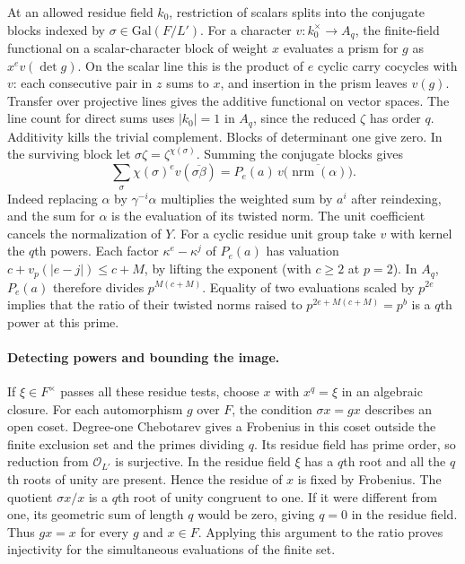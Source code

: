At an allowed residue field $k_0$, restriction of scalars splits into
the conjugate blocks indexed by $\sigma\in\mathrm{Gal}(F/L')$.
For a character $v:k_0^\times\to A_q$, the finite-field functional
on a scalar-character block of weight $x$ evaluates a prism for $g$
as $x^e v(\det g)$. On the scalar line this is the product of $e$
cyclic carry cocycles with $v$: each consecutive pair in $z$ sums to
$x$, and insertion in the prism leaves $v(g)$. Transfer over projective
lines gives the additive functional on vector spaces. The line count
for direct sums uses $|k_0|=1$ in $A_q$, since the reduced $\zeta$ has
order $q$. Additivity kills the trivial complement. Blocks of determinant
one give zero. In the surviving block let $\sigma\zeta=\zeta^{\chi(\sigma)}$.
Summing the conjugate blocks gives
\[
 \sum_\sigma \chi(\sigma)^e v(\overline{\sigma\beta})
   =P_e(a)\,v\big(\overline{\operatorname{nrm}(\alpha)}\big).
\]
Indeed replacing $\alpha$ by $\gamma^{-i}\alpha$ multiplies the
weighted sum by $a^i$ after reindexing, and the sum for $\alpha$ is
the evaluation of its twisted norm. The unit coefficient cancels the
normalization of $Y$. For a cyclic residue unit group take $v$ with
kernel the $q$th powers. Each factor $\kappa^e-\kappa^j$ of $P_e(a)$
has valuation $c+v_p(|e-j|)\le c+M$, by lifting the exponent
(with $c\ge2$ at $p=2$). In $A_q$, $P_e(a)$ therefore divides
$p^{M(c+M)}$. Equality of two evaluations scaled by $p^{2e}$
implies that the ratio of their twisted norms raised to
$p^{2e+M(c+M)}=p^b$ is a $q$th power at this prime.

\paragraph{Detecting powers and bounding the image.}\label{kone:rank}
If $\xi\in F^\times$ passes all these residue tests, choose
$x$ with $x^q=\xi$ in an algebraic closure. For each automorphism
$g$ over $F$, the condition $\sigma x=gx$ describes an open coset.
Degree-one Chebotarev gives a Frobenius in this coset outside the finite
exclusion set and the primes dividing $q$. Its residue field has prime
order, so reduction from $\mathcal O_{L'}$ is surjective. In the residue
field $\xi$ has a $q$th root and all the $q$th roots of unity are
present. Hence the residue of $x$ is fixed by Frobenius. The quotient
$\sigma x/x$ is a $q$th root of unity congruent to one. If it were
different from one, its geometric sum of length $q$ would be zero,
giving $q=0$ in the residue field. Thus $gx=x$ for every $g$ and
$x\in F$. Applying this argument to the ratio proves injectivity
for the simultaneous evaluations of the finite set.

